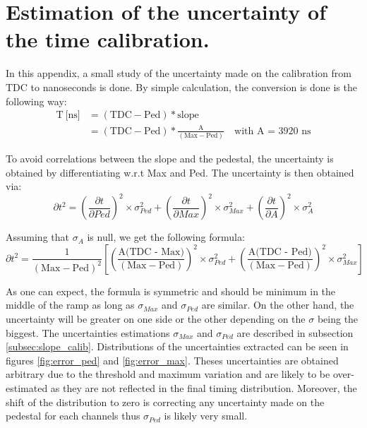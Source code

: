 \chapter{Estimation of the uncertainty of the time calibration.}
\label{appendix:calib_error}

In this appendix, a small study of the uncertainty made on the calibration from TDC to nanoseconds is done. By simple calculation, the conversion is done is the following way:
\begin{equation*}
	\begin{split}
		\text{T} \: \text{[ns]} & = ( \text{TDC} - \text{Ped} ) * \text{slope} \\
		& = ( \text{TDC} - \text{Ped} ) * \frac{\text{A}}{(\text{Max} - \text{Ped})} \quad \text{with A = 3920 ns}
	\end{split}
\end{equation*}

To avoid correlations between the slope and the pedestal, the uncertainty is obtained by differentiating w.r.t Max and Ped. The uncertainty is then obtained via:
\begin{equation*}
	\partial t^2 = \left(\frac{\partial t}{\partial Ped}\right)^2 \times \sigma_{Ped}^2 + \left(\frac{\partial t}{\partial Max}\right)^2 \times \sigma_{Max}^2 + \left(\frac{\partial t}{\partial A}\right)^2 \times \sigma_{A}^2
\end{equation*}

Assuming that $\sigma_{A}$ is null, we get the following formula:
\begin{equation*}
	\partial t^2 = \frac{1}{(\text{Max} - \text{Ped})^2} \left[ \left( \frac{\text{A(TDC - Max)}}{(\text{Max} - \text{Ped})} \right)^2 \times \sigma_{Ped}^2 + \left( \frac{\text{A(TDC - Ped)}}{(\text{Max} - \text{Ped})} \right)^2 \times \sigma_{Max}^2 \right]
\end{equation*}

As one can expect, the formula is symmetric and should be minimum in the middle of the ramp as long as $\sigma_{Max}$ and $\sigma_{Ped}$ are similar. On the other hand, the uncertainty will be greater on one side or the other depending on the $\sigma$ being the biggest. The uncertainties estimations $\sigma_{Max}$ and $\sigma_{Ped}$ are described in subsection \ref{subsec:slope_calib}. Distributions of the uncertainties extracted can be seen in figures \ref{fig:error_ped} and \ref{fig:error_max}. Theses uncertainties are obtained arbitrary due to the threshold and maximum variation and are likely to be over-estimated as they are not reflected in the final timing distribution. Moreover, the shift of the distribution to zero is correcting any uncertainty made on the pedestal for each channels thus $\sigma_{Ped}$ is likely very small.

